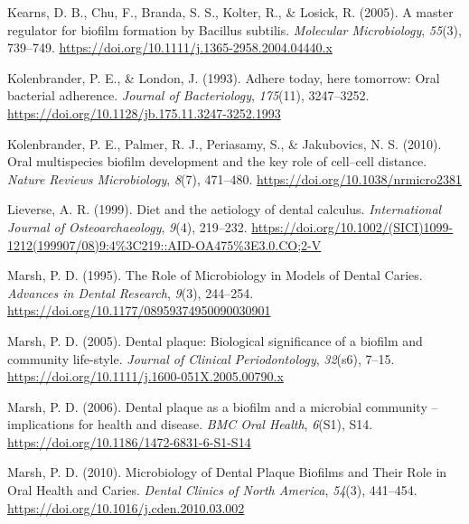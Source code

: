 \documentclass[
  letterpaper,
]{book}
\newlength{\cslhangindent}
\newlength{\cslentryspacingunit} %
\newenvironment{CSLReferences}[2] %
 {%
  \setlength{\parindent}{0pt}
  \ifodd #1
  \let\oldpar\par
  \def\par{\hangindent=\cslhangindent\oldpar}
  \fi
  \setlength{\parskip}{#2\cslentryspacingunit}
 }%
 {}
\begin{document}
\begin{CSLReferences}{1}{0}
\leavevmode{}%
Kearns, D. B., Chu, F., Branda, S. S., Kolter, R., \& Losick, R. (2005).
A master regulator for biofilm formation by {Bacillus} subtilis.
\emph{Molecular Microbiology}, \emph{55}(3), 739--749.
\url{https://doi.org/10.1111/j.1365-2958.2004.04440.x}

\leavevmode{}%
Kolenbrander, P. E., \& London, J. (1993). Adhere today, here tomorrow:
Oral bacterial adherence. \emph{Journal of Bacteriology},
\emph{175}(11), 3247--3252.
\url{https://doi.org/10.1128/jb.175.11.3247-3252.1993}

\leavevmode{}%
Kolenbrander, P. E., Palmer, R. J., Periasamy, S., \& Jakubovics, N. S.
(2010). Oral multispecies biofilm development and the key role of
cell--cell distance. \emph{Nature Reviews Microbiology}, \emph{8}(7),
471--480. \url{https://doi.org/10.1038/nrmicro2381}

\leavevmode{}%
Lieverse, A. R. (1999). Diet and the aetiology of dental calculus.
\emph{International Journal of Osteoarchaeology}, \emph{9}(4), 219--232.
\url{https://doi.org/10.1002/(SICI)1099-1212(199907/08)9:4\%3C219::AID-OA475\%3E3.0.CO;2-V}

\leavevmode{}%
Marsh, P. D. (1995). The {Role} of {Microbiology} in {Models} of {Dental
Caries}. \emph{Advances in Dental Research}, \emph{9}(3), 244--254.
\url{https://doi.org/10.1177/08959374950090030901}

\leavevmode{}%
Marsh, P. D. (2005). Dental plaque: Biological significance of a biofilm
and community life-style. \emph{Journal of Clinical Periodontology},
\emph{32}(s6), 7--15.
\url{https://doi.org/10.1111/j.1600-051X.2005.00790.x}

\leavevmode{}%
Marsh, P. D. (2006). Dental plaque as a biofilm and a microbial
community -- implications for health and disease. \emph{BMC Oral
Health}, \emph{6}(S1), S14.
\url{https://doi.org/10.1186/1472-6831-6-S1-S14}

\leavevmode{}%
Marsh, P. D. (2010). Microbiology of {Dental Plaque Biofilms} and {Their
Role} in {Oral Health} and {Caries}. \emph{Dental Clinics of North
America}, \emph{54}(3), 441--454.
\url{https://doi.org/10.1016/j.cden.2010.03.002}


\end{CSLReferences}
\end{document}
